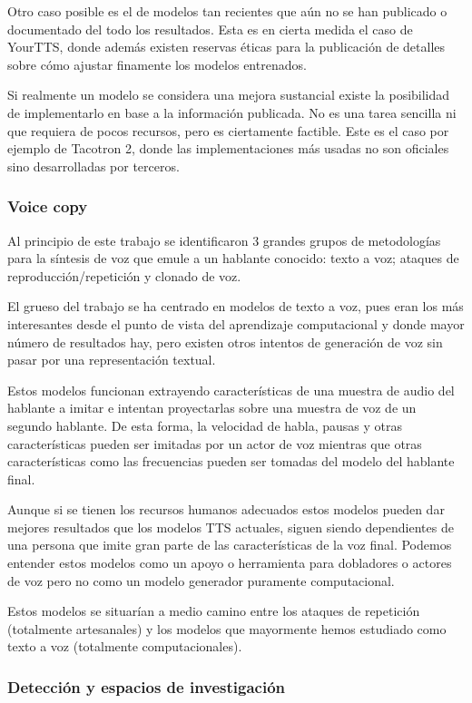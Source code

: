 Otro caso posible es el de modelos tan recientes que aún no se han publicado o documentado del todo los resultados. Esta es en cierta medida el caso de YourTTS, donde además existen reservas éticas para la publicación de detalles sobre cómo ajustar finamente los modelos entrenados.

Si realmente un modelo se considera una mejora sustancial existe la posibilidad de implementarlo en base a la información publicada. No es una tarea sencilla ni que requiera de pocos recursos, pero es ciertamente factible. Este es el caso por ejemplo de Tacotron 2, donde las implementaciones más usadas no son oficiales sino desarrolladas por terceros.

\subsubsection{Voice copy}

Al principio de este trabajo se identificaron 3 grandes grupos de metodologías para la síntesis de voz que emule a un hablante conocido: texto a voz; ataques de reproducción/repetición y clonado de voz.

El grueso del trabajo se ha centrado en modelos de texto a voz, pues eran los más interesantes desde el punto de vista del aprendizaje computacional y donde mayor número de resultados hay, pero existen otros intentos de generación de voz sin pasar por una representación textual.

Estos modelos funcionan extrayendo características de una muestra de audio del hablante a imitar e intentan proyectarlas sobre una muestra de voz de un segundo hablante. De esta forma, la velocidad de habla, pausas y otras características pueden ser imitadas por un actor de voz mientras que otras características como las frecuencias pueden ser tomadas del modelo del hablante final.

Aunque si se tienen los recursos humanos adecuados estos modelos pueden dar mejores resultados que los modelos TTS actuales, siguen siendo dependientes de una persona que imite gran parte de las características de la voz final. Podemos entender estos modelos como un apoyo o herramienta para dobladores o actores de voz pero no como un modelo generador puramente computacional.

Estos modelos se situarían a medio camino entre los ataques de repetición (totalmente artesanales) y los modelos que mayormente hemos estudiado como texto a voz (totalmente computacionales).

\subsubsection{Detección y espacios de investigación}

